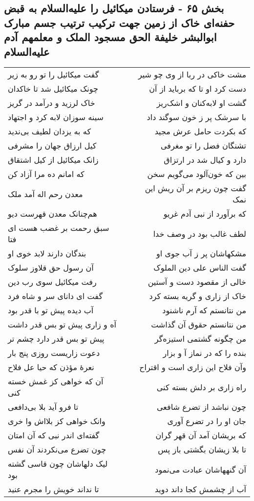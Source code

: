 \begin{center}
\section*{بخش ۶۵ - فرستادن میکائیل را علیه‌السلام به قبض حفنه‌ای خاک از زمین جهت ترکیب ترتیب جسم مبارک ابوالبشر خلیفة  الحق مسجود الملک و معلمهم آدم علیه‌السلام}
\label{sec:sh065}
\begin{longtable}{l p{0.5cm} r}
گفت میکائیل را تو رو به زیر
&&
مشت خاکی در ربا از وی چو شیر
\\
چونک میکائیل شد تا خاکدان
&&
دست کرد او تا که برباید از آن
\\
خاک لرزید و درآمد در گریز
&&
گشت او لابه‌کنان و اشک‌ریز
\\
سینه سوزان لابه کرد و اجتهاد
&&
با سرشک پر ز خون سوگند داد
\\
که به یزدان لطیف بی‌ندید
&&
که بکردت حامل عرش مجید
\\
کیل ارزاق جهان را مشرفی
&&
تشنگان فضل را تو مغرفی
\\
زانک میکائیل از کیل اشتقاق
&&
دارد و کیال شد در ارتزاق
\\
که امانم ده مرا آزاد کن
&&
بین که خون‌آلود می‌گویم سخن
\\
معدن رحم اله آمد ملک
&&
گفت چون ریزم بر آن ریش این نمک
\\
هم‌چنانک معدن قهرست دیو
&&
که برآورد از نبی آدم غریو
\\
سبق رحمت بر غضب هست ای فتا
&&
لطف غالب بود در وصف خدا
\\
بندگان دارند لابد خوی او
&&
مشکهاشان پر ز آب جوی او
\\
آن رسول حق قلاوز سلوک
&&
گفت الناس علی دین الملوک
\\
رفت میکائیل سوی رب دین
&&
خالی از مقصود دست و آستین
\\
گفت ای دانای سر و شاه فرد
&&
خاک از زاری و گریه بسته کرد
\\
آب دیده پیش تو با قدر بود
&&
من نتانستم که آرم ناشنود
\\
آه و زاری پیش تو بس قدر داشت
&&
من نتانستم حقوق آن گذاشت
\\
پیش تو بس قدر دارد چشم تر
&&
من چگونه گشتمی استیزه‌گر
\\
دعوت زاریست روزی پنج بار
&&
بنده را که در نماز آ و بزار
\\
نعرهٔ مؤذن که حیا عل فلاح
&&
وآن فلاح این زاری است و اقتراح
\\
آن که خواهی کز غمش خسته کنی
&&
راه زاری بر دلش بسته کنی
\\
تا فرو آید بلا بی‌دافعی
&&
چون نباشد از تضرع شافعی
\\
وانک خواهی کز بلااش وا خری
&&
جان او را در تضرع آوری
\\
گفته‌ای اندر نبی که آن امتان
&&
که بریشان آمد آن قهر گران
\\
چون تضرع می‌نکردند آن نفس
&&
تا بلا زیشان بگشتی باز پس
\\
لیک دلهاشان چون قاسی گشته بود
&&
آن گنههاشان عبادت می‌نمود
\\
تا نداند خویش را مجرم عنید
&&
آب از چشمش کجا داند دوید
\\
\end{longtable}
\end{center}
